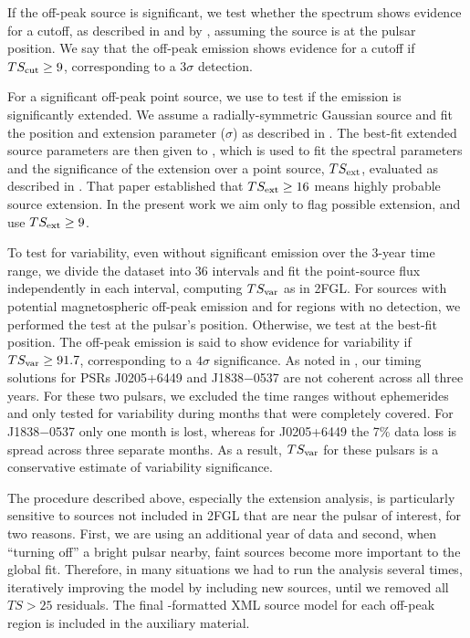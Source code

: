 If the off-peak source is significant, we test whether the spectrum shows
evidence for a cutoff, as described in 
and by \citet{ackermann_2011a_fermi-lat-search}, assuming the source is at
the pulsar position.  We say that the off-peak emission shows evidence for
a cutoff if $TS_{\rm cut}\geq9$, corresponding to a $3\sigma$ detection.

For a significant off-peak point source,
we use \pointlike to test if the emission is significantly
extended.  We assume a radially-symmetric Gaussian source
and fit the position and extension parameter ($\sigma$) as described
in \citet{lande_2012_search-spatially}.  The best-fit
extended source parameters are then given to \gtlike, which is used
to fit the spectral parameters and the significance of the extension
over a point source, $TS_{\rm ext}$, evaluated as described in
\citet{lande_2012_search-spatially}.  
That paper established that $TS_{\rm ext}\geq16$ means highly probable source extension.
In the present work we aim only to flag possible extension, and use  $TS_{\rm ext}\geq9$.

To test for variability, even without significant emission over the 3-year time
range, we divide the dataset into 36 intervals and fit the point-source
flux independently in each interval, 
computing $TS_{\rm var}$ as in 2FGL.  
For sources with potential magnetospheric off-peak emission and for
regions with no detection, we performed the test at the pulsar's position.
Otherwise, we test at the best-fit position.
The off-peak emission is said
to show evidence for variability if $TS_{\rm var}\geq91.7$, corresponding
to a $4\sigma$ significance.  
%
As noted in , our timing solutions for PSRs J0205+6449 and J1838$-$0537 are not  
coherent across all three years.  
For these two pulsars, we excluded the time ranges without ephemerides  
and only tested for variability during months that were completely covered.  
For J1838$-$0537 only one month is lost, whereas for J0205+6449 the 7\% data loss is spread across
three separate months.
As a result, $TS_{\rm var}$ for these pulsars is a conservative estimate of variability significance.

The procedure described above, especially the extension analysis,
is particularly sensitive to sources not included in 2FGL that are near the pulsar of interest,
for two reasons.
First, we are using an additional year of data and second,
when ``turning off'' a bright pulsar nearby, faint sources become more
important to the global fit.  Therefore, in many situations we had to run
the analysis several times, iteratively improving the model by including
new sources, until we removed all $TS>25$ residuals. The final
\gtlike-formatted XML source model for each off-peak 
region is included in the auxiliary material.

